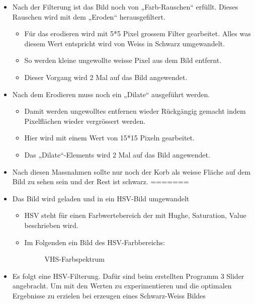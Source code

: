 \begin{itemize}
\begin{itemize}
\begin{itemize}
		\end{itemize}
	\end{itemize}
	\item Nach der Filterung ist das Bild noch von „Farb-Rauschen“ erfüllt. Dieses Rauschen wird mit dem „Eroden“ herausgefiltert.
	\begin{itemize}
		\item Für das erodieren wird mit 5*5 Pixel grossem Filter gearbeitet. Alles was diesem Wert entspricht wird von Weiss in Schwarz umgewandelt.
		\item So werden kleine ungewollte weisse Pixel aus dem Bild entfernt.
		\item Dieser Vorgang wird 2 Mal auf das Bild angewendet.
	\end{itemize}
	\item Nach dem Erodieren muss noch ein „Dilate“ ausgeführt werden.
	\begin{itemize}
		\item Damit werden ungewolltes entfernen wieder Rückgängig gemacht indem Pixelflächen wieder vergrössert werden.
		\item Hier wird mit einem Wert von 15*15 Pixeln gearbeitet.
		\item Das „Dilate“-Elements wird 2 Mal auf das Bild angewendet.
	\end{itemize}
	\item Nach diesen Massnahmen sollte nur noch der Korb als weisse Fläche auf dem Bild zu sehen sein und der Rest ist schwarz.
=======
    \item Das Bild wird geladen und in ein HSV-Bild umgewandelt
    \begin{itemize}
        \item HSV steht für einen Farbwertebereich der mit Hughe, Saturation, 
            Value beschrieben wird.
        \item Im Folgenden ein Bild des HSV-Farbbereichs:\\
        \begin{figure}[!h]
            \centering
            \caption{VHS-Farbspektrum}
            \label{fig:HSV-Farbspektrum}
        \end{figure}
    \end{itemize}
    \item Es folgt eine HSV-Filterung. Dafür sind beim erstellten Programm 3 
        Slider angebracht. Um mit den Werten zu experimentieren und die 
        optimalen Ergebnisse zu erzielen bei erzeugen eines Schwarz-Weiss Bildes

\end{itemize}

